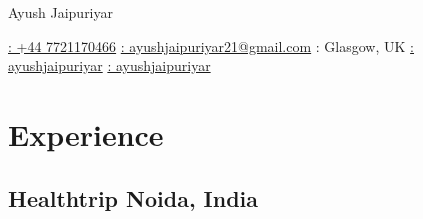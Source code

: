\documentclass[10pt]{article}
\newcommand{\rside}[1]{
  \hfill {\small\color{accent} #1}%
}
\begin{document}

\begin{center}
  {
    \fontsize{30}{12}
    \selectfont
    \color{accent}
    Ayush Jaipuriyar %
  } \\ \medskip


  \href{tel:+447721170466}{\faPhone: +44 7721170466} \hspace{0.1em}
  \href{mailto:ayushjaipuriyar21@gmail.com}{\faEnvelope: ayushjaipuriyar21@gmail.com} \hspace{0.1em}
  {\faGlobe: Glasgow, UK} \hspace{0.1em}
  \href{https://github.com/ayushjaipuriyar}{\faGithub: ayushjaipuriyar} \hspace{0.1em}
  \href{https://www.linkedin.com/in/ayushjaipuriyar}{\faLinkedin: ayushjaipuriyar}
\end{center}


\section{Experience}
\subsection{Healthtrip \rside{Noida, India}}
\end{document}
